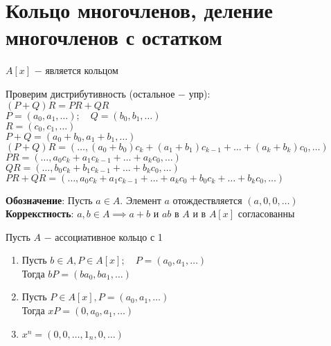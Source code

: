 \DeclareRobustCommand{\divby}{%
  \mathrel{\vbox{\baselineskip.65ex\lineskiplimit0pt\hbox{.}\hbox{.}\hbox{.}}}%
}



\section{Кольцо многочленов, деление многочленов с остатком}

\begin{theorem}
	$A[x]$ $-$ является кольцом\\
\end{theorem}
\begin{replacementproof}
	Проверим дистрибутивность (остальное $-$ упр):\\
	$(P+Q)R=PR+QR$ \\
	$P=(a_0,a_1,\ldots); \quad Q=(b_0,b_1,\ldots)$ \\
	$R=(c_0,c_1,\ldots)$ \\
	$P+Q=(a_0+b_0,a_1+b_1,\ldots)$ \\
	$(P+Q)R=(\ldots, (a_0+b_0)c_k+(a_1+b_1)c_{k-1}+\ldots+(a_k+b_k)c_0, \ldots)$\\
	$PR=(\ldots,a_0c_k+a_1c_{k-1}+\ldots+a_kc_0,\ldots)$ \\
	$QR=(\ldots,b_0c_k+b_1c_{k-1}+\ldots+b_kc_0,\ldots)$\\
	$PR+QR=(\ldots,a_0c_k+a_1c_{k-1}+\ldots+a_kc_0+b_0c_k+\ldots+b_kc_0, \ldots)$
\end{replacementproof}
\textbf{Обозначение}: Пусть $a \in A$.  Элемент $a$ отождествляется $(a,0,0,\ldots)$ \\
\textbf{Коррекстность}: $a,b \in A \implies a+b$ и $ab$ в  $A$ и в  $A[x]$ согласованны
\begin{properties} Пусть $A$ $-$ ассоциативное кольцо с 1
	\begin{enumerate}
		\item Пусть $b \in A, P \in A[x]; \quad P=(a_0,a_1,\ldots)$ \\
			Тогда $bP=(ba_0,ba_1,\ldots)$ 
		\item Пусть $P \in A[x], P=(a_0,a_1,\ldots)$ \\
			Тогда $xP=(0,a_0,a_1,\ldots)$ 
		\item $x^{n}=(0,0,\ldots,1_{n},0,\ldots)$
	\end{enumerate}
\end{properties}
